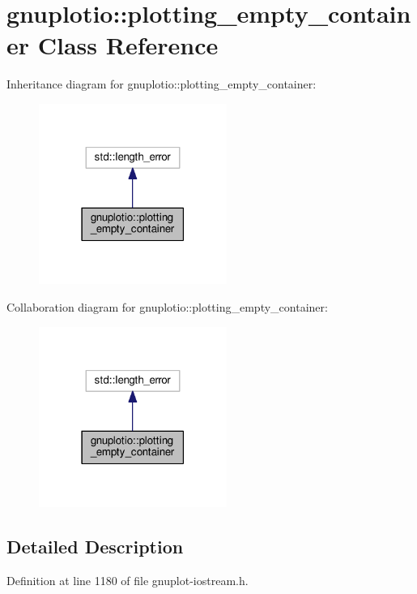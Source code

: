 \hypertarget{classgnuplotio_1_1plotting__empty__container}{}\section{gnuplotio\+:\+:plotting\+\_\+empty\+\_\+container Class Reference}
\label{classgnuplotio_1_1plotting__empty__container}


Inheritance diagram for gnuplotio\+:\+:plotting\+\_\+empty\+\_\+container\+:\nopagebreak
\begin{figure}[H]
\begin{center}
\leavevmode
\includegraphics[width=174pt]{classgnuplotio_1_1plotting__empty__container__inherit__graph}
\end{center}
\end{figure}


Collaboration diagram for gnuplotio\+:\+:plotting\+\_\+empty\+\_\+container\+:\nopagebreak
\begin{figure}[H]
\begin{center}
\leavevmode
\includegraphics[width=174pt]{classgnuplotio_1_1plotting__empty__container__coll__graph}
\end{center}
\end{figure}


\subsection{Detailed Description}


Definition at line 1180 of file gnuplot-\/iostream.\+h.

